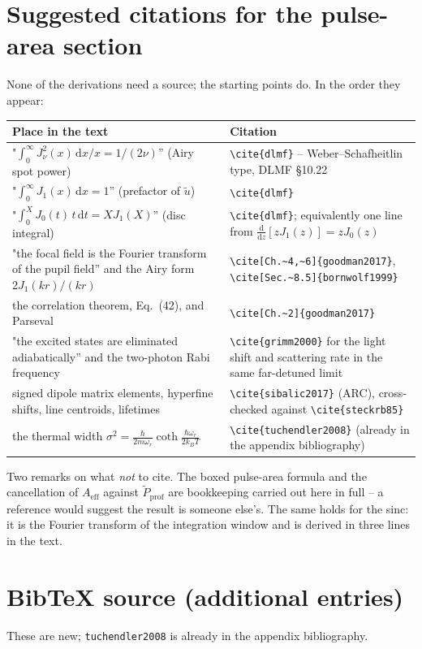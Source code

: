 \documentclass[11pt,a4paper]{article}
\newcommand{\dd}{\mathrm d}
\begin{document}
\section{Suggested citations for the pulse-area section}

None of the derivations need a source; the starting points do. In the order
they appear:

\begin{center}
\begin{tabular}{p{}p{}}
\toprule
Place in the text & Citation\\
\midrule
"$\int_0^\infty J_\nu^2(x)\,\dd x/x = 1/(2\nu)$'' (Airy spot power) &
\verb|\cite{dlmf}| -- Weber--Schafheitlin type, DLMF \S10.22\\[4pt]
"$\int_0^\infty J_1(x)\,\dd x = 1$'' (prefactor of $\tilde u$) &
\verb|\cite{dlmf}|\\[4pt]
"$\int_0^X J_0(t)\,t\,\dd t = X J_1(X)$'' (disc integral) &
\verb|\cite{dlmf}|; equivalently one line from
$\frac{\dd}{\dd z}\!\left[zJ_1(z)\right]=zJ_0(z)$\\[4pt]
"the focal field is the Fourier transform of the pupil field'' and the
Airy form $2J_1(kr)/(kr)$ &
\verb|\cite[Ch.~4,~6]{goodman2017}|, \verb|\cite[Sec.~8.5]{bornwolf1999}|\\[4pt]
the correlation theorem, Eq.~(42), and Parseval &
\verb|\cite[Ch.~2]{goodman2017}|\\[4pt]
"the excited states are eliminated adiabatically'' and the two-photon
Rabi frequency &
\verb|\cite{grimm2000}| for the light shift and scattering rate in the same
far-detuned limit\\[4pt]
signed dipole matrix elements, hyperfine shifts, line centroids, lifetimes &
\verb|\cite{sibalic2017}| (ARC), cross-checked against \verb|\cite{steckrb85}|\\[4pt]
the thermal width
$\sigma^2=\frac{\hbar}{2m\omega_r}\coth\frac{\hbar\omega_r}{2k_BT}$ &
\verb|\cite{tuchendler2008}| (already in the appendix bibliography)\\
\bottomrule
\end{tabular}
\end{center}

\noindent Two remarks on what \emph{not} to cite. The boxed pulse-area formula
and the cancellation of $A_\mathrm{eff}$ against $\tilde P_\mathrm{prof}$ are
bookkeeping carried out here in full -- a reference would suggest the result is
someone else's. The same holds for the sinc: it is the Fourier transform of the
integration window and is derived in three lines in the text.




\clearpage
\section*{BibTeX source (additional entries)}
\noindent These are new; \texttt{tuchendler2008} is already in the appendix
bibliography.
\scriptsize

\normalsize
\end{document}
